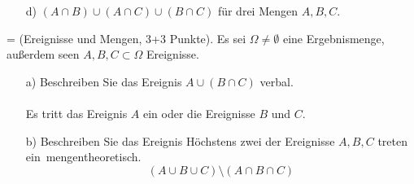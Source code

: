 \documentclass[twoside]{article}
\begin{document}
\begin{enumerate}
	
	\item[d)]$(A \cap B) \cup (A \cap C) \cup (B \cap C)$ für drei Mengen $A,B,C$.\\
\end{enumerate}
\fi
\ifnum\ZettelZwei=\True
{}
(Ereignisse und Mengen, 3+3 Punkte).
Es sei $\Omega \neq \emptyset$ eine Ergebnismenge, außerdem seen $A,B,C \subset \Omega$ Ereignisse.
\begin{enumerate}
	\item[a)] Beschreiben Sie das Ereignis $A \cup (B \cap C)$ verbal.\\
	\vspace{.5cm}\\ 
	Es tritt das Ereignis $A$ ein oder die Ereignisse $B$ und $C$.
	
	\item[b)]Beschreiben Sie das Ereignis \dq Höchstens zwei der Ereignisse $A,B,C$ treten ein\dq ~mengentheoretisch.
	\[
		(A \cup B \cup C) \setminus (A \cap B \cap C)
	\]
\end{enumerate}
\end{document}
